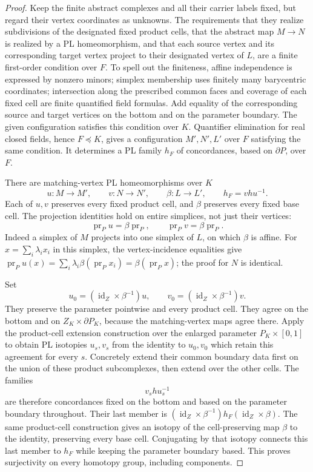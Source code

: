 \documentclass[11pt,a4paper]{article}
\theoremstyle{definition}
\begin{document}
\begin{proof}
Keep the finite abstract complexes and all their carrier labels
fixed, but regard their vertex coordinates as unknowns. The
requirements that they realize subdivisions of the designated
fixed product cells, that the abstract map $M\to N$ is realized
by a PL homeomorphism, and that each source vertex and its
corresponding target vertex project to their designated vertex
of $L$, are a finite first-order condition over $F$. To spell
out the finiteness, affine independence is expressed by nonzero
minors; simplex membership uses finitely many barycentric
coordinates; intersection along the prescribed common faces
and coverage of each fixed cell are finite quantified field
formulas. Add equality of the corresponding source and target
vertices on the bottom and on the parameter boundary. The
given configuration satisfies this condition over $K$.
Quantifier elimination for real closed fields, hence
$F\preccurlyeq K$, gives a configuration $M',N',L'$ over $F$
satisfying the same condition. It determines a PL family
$h_F$ of concordances, based on $\partial P$, over $F$.

There are matching-vertex PL homeomorphisms over $K$
\[
 u:M\longrightarrow M',\qquad
 v:N\longrightarrow N',\qquad
 \beta:L\longrightarrow L',
 \qquad h_F=vhu^{-1}.
\]
Each of $u,v$ preserves every fixed product cell, and $\beta$
preserves every fixed base cell. The projection identities
hold on entire simplices, not just their vertices:
\[
 \operatorname{pr}_P u=\beta\operatorname{pr}_P,\qquad
 \operatorname{pr}_P v=\beta\operatorname{pr}_P.
\]
Indeed a simplex of $M$ projects into one simplex of $L$,
on which $\beta$ is affine. For
$x=\sum_i\lambda_i x_i$ in this simplex, the vertex-incidence
equalities give
$\operatorname{pr}_P u(x)=\sum_i\lambda_i\beta(\operatorname{pr}_P x_i)
=\beta(\operatorname{pr}_P x)$; the proof for $N$ is identical.

Set
\[
 u_0=(\operatorname{id}_Z\times\beta^{-1})u,\qquad
 v_0=(\operatorname{id}_Z\times\beta^{-1})v.
\]
They preserve the parameter pointwise and every product cell.
They agree on the bottom and on $Z_K\times\partial P_K$,
because the matching-vertex maps agree there. Apply the
product-cell extension construction over the enlarged parameter
$P_K\times[0,1]$ to obtain PL isotopies $u_s,v_s$ from the
identity to $u_0,v_0$ which retain this agreement for every $s$.
Concretely extend their common boundary data first on the union
of these product subcomplexes, then extend over the other cells.
The families
\[
 v_s h u_s^{-1}
\]
are therefore concordances fixed on the bottom and based on
the parameter boundary throughout. Their last member is
$(\operatorname{id}_Z\times\beta^{-1})h_F
(\operatorname{id}_Z\times\beta)$.
The same product-cell construction gives an isotopy of the
cell-preserving map $\beta$ to the identity, preserving every
base cell. Conjugating by that isotopy connects this last member
to $h_F$ while keeping the parameter boundary based. This proves
surjectivity on every homotopy group, including components.


\end{proof}
\end{document}
